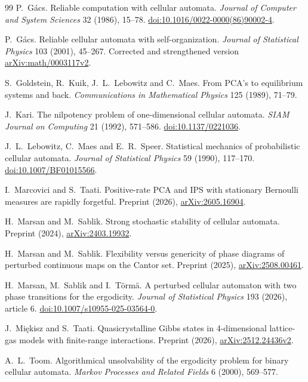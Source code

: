 \begin{thebibliography}{99}
 P.~G\'acs.
Reliable computation with cellular automata.
\emph{Journal of Computer and System Sciences} 32 (1986), 15--78.
\href{https://doi.org/10.1016/0022-0000(86)90002-4}{doi:10.1016/0022-0000(86)90002-4}.

 P.~G\'acs.
Reliable cellular automata with self-organization.
\emph{Journal of Statistical Physics} 103 (2001), 45--267.
Corrected and strengthened version \href{https://arxiv.org/abs/math/0003117v2}{arXiv:math/0003117v2}.

 S.~Goldstein, R.~Kuik, J.~L.~Lebowitz and C.~Maes.
From PCA's to equilibrium systems and back.
\emph{Communications in Mathematical Physics} 125 (1989), 71--79.

 J.~Kari.
The nilpotency problem of one-dimensional cellular automata.
\emph{SIAM Journal on Computing} 21 (1992), 571--586.
\href{https://doi.org/10.1137/0221036}{doi:10.1137/0221036}.

 J.~L.~Lebowitz, C.~Maes and E.~R.~Speer.
Statistical mechanics of probabilistic cellular automata.
\emph{Journal of Statistical Physics} 59 (1990), 117--170.
\href{https://doi.org/10.1007/BF01015566}{doi:10.1007/BF01015566}.

 I.~Marcovici and S.~Taati.
Positive-rate PCA and IPS with stationary Bernoulli measures are rapidly forgetful.
Preprint (2026), \href{https://arxiv.org/abs/2605.16904}{arXiv:2605.16904}.

 H.~Marsan and M.~Sablik.
Strong stochastic stability of cellular automata.
Preprint (2024), \href{https://arxiv.org/abs/2403.19932}{arXiv:2403.19932}.

 H.~Marsan and M.~Sablik.
Flexibility versus genericity of phase diagrams of perturbed continuous maps on the Cantor set.
Preprint (2025), \href{https://arxiv.org/abs/2508.00461}{arXiv:2508.00461}.

 H.~Marsan, M.~Sablik and I.~T\"orm\"a.
A perturbed cellular automaton with two phase transitions for the ergodicity.
\emph{Journal of Statistical Physics} 193 (2026), article 6.
\href{https://doi.org/10.1007/s10955-025-03564-0}{doi:10.1007/s10955-025-03564-0}.

 J.~Mi\k{e}kisz and S.~Taati.
Quasicrystalline Gibbs states in 4-dimensional lattice-gas models with finite-range interactions.
Preprint (2026), \href{https://arxiv.org/abs/2512.24436v2}{arXiv:2512.24436v2}.

 A.~L.~Toom.
Algorithmical unsolvability of the ergodicity problem for binary cellular automata.
\emph{Markov Processes and Related Fields} 6 (2000), 569--577.


\end{thebibliography}
